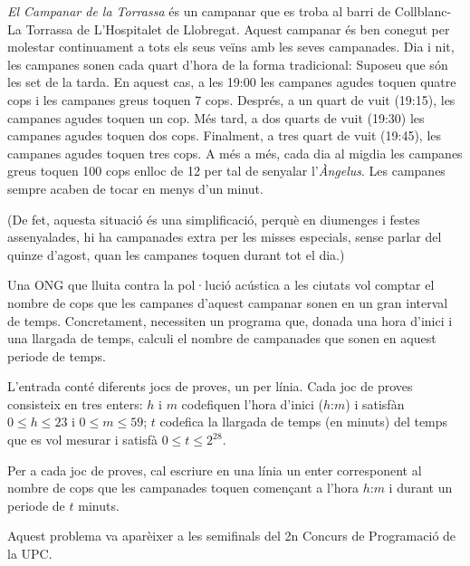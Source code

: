

\Statement


\emph{El Campanar de la Torrassa} és un campanar que es troba al barri de
Collblanc-La Torrassa de L'Hospitalet de Llobregat. Aquest campanar és ben
conegut per molestar continuament a tots els seus veïns amb les seves
campanades.
Dia i nit, les campanes sonen cada quart d'hora de la forma
tradicional: Suposeu que són les set de la tarda. En aquest
cas, a les 19:00 les campanes agudes toquen quatre cops i les campanes
greus toquen 7 cops. Després, a un quart de vuit (19:15),
les campanes agudes toquen un cop. Més tard, a dos quarts de vuit
(19:30) les campanes agudes toquen dos cops. Finalment,
a tres quart de vuit (19:45), les campanes agudes toquen tres cops.
A més a més, cada dia al migdia les campanes greus toquen 100 cops enlloc
de 12 per tal de senyalar l'\emph{Àngelus}. Les campanes sempre
acaben de tocar en menys d'un minut.

\medskip

(De fet, aquesta situació és una simplificació, perquè en diumenges
i festes assenyalades, hi ha campanades extra per les misses 
especials, sense parlar del quinze d'agost, quan les campanes toquen durant
tot el dia.)

\medskip

Una ONG que lluita contra la pol·lució acústica a les ciutats
vol comptar el nombre de cops que les campanes d'aquest campanar
sonen en un gran interval de temps. Concretament, necessiten un
programa que, donada una hora d'inici i una llargada de temps,
calculi el nombre de campanades que sonen en aquest periode de temps.


\Input

L'entrada conté diferents jocs de proves, un per línia. Cada joc de proves
consisteix en tres enters: $h$ i $m$ codefiquen l'hora d'inici ($h$:$m$) i
satisfàn $0\le h\le 23$ i $0\le m\le 59$; $t$ codefica la llargada de temps
(en minuts) del temps que es vol mesurar i satisfà $0\le t\le2^{28}$. 

\Output

Per a cada joc de proves, cal escriure en una línia un enter corresponent
al nombre de cops que les campanades toquen començant a l'hora $h$:$m$ 
i durant un periode de $t$
minuts.


\Sample

\Observation

Aquest problema va aparèixer a les semifinals del 2n Concurs de Programació de
la UPC.
